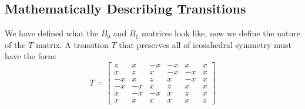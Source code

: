 \documentclass[a4paper,10pt]{article}
\theoremstyle{plain}
\theoremstyle{definition}
\theoremstyle{remark}
\begin{document}
\subsection{Mathematically Describing Transitions}
We have defined what the \( B_0 \) and \( B_1 \) matrices look like, now we define the nature of the \( T \) matrix.
A transition \(T\) that preserves all of icosahedral symmetry must have the form: \begin{equation} \label{eq:ico-transition}
	T = \begin{bmatrix}
		z  & x  & -x & -x & x  & x \\
		x  & z  & x  & -x & -x & x \\
		-x & x  & z  & x  & -x & x \\
		-x & -x & x  & z  & x  & x \\
		x  & -x & -x & x  & z  & x \\
		x  & x  & x  & x  & x  & z
\end{bmatrix}\end{equation}
\end{document}
